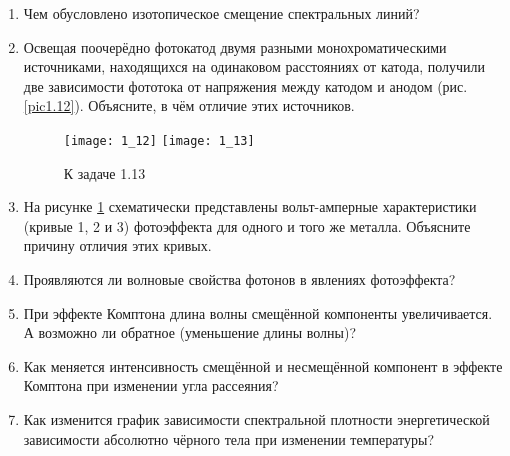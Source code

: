 \begin{enumerate}
\item Чем обусловлено изотопическое смещение спектральных линий?

\item Освещая поочерёдно фотокатод двумя разными монохроматическими
источниками, находящихся на одинаковом расстояниях от катода, получили две
зависимости фототока от напряжения между катодом и анодом (рис. \ref{pic1.12}).
Объясните, в чём отличие этих источников.

    \begin{figure}[h!]
        \center
        \texttt{[image: 1\_12]} \hspace*{2em}
        \texttt{[image: 1\_13]}
        \parbox{.37\textwidth}{\caption{К задаче 1.12} \label{pic1.12}} \hspace*{2em}
        \parbox{.37\textwidth}{\caption{К задаче 1.13} \label{pic1.13}}
    \end{figure}

\item На рисунке \ref{pic1.13} схематически представлены вольт-амперные характеристики
(кривые 1, 2 и 3) фотоэффекта для одного и того же металла. Объясните причину
отличия этих кривых.

\item Проявляются ли волновые свойства фотонов в явлениях фотоэффекта?

\item При эффекте Комптона длина волны смещённой компоненты увеличивается. А
возможно ли обратное (уменьшение длины волны)?

\item Как меняется интенсивность смещённой и несмещённой компонент в эффекте
Комптона при изменении угла рассеяния?

\item Как изменится график зависимости спектральной плотности энергетической
зависимости абсолютно чёрного тела при изменении температуры?

\end{enumerate}
